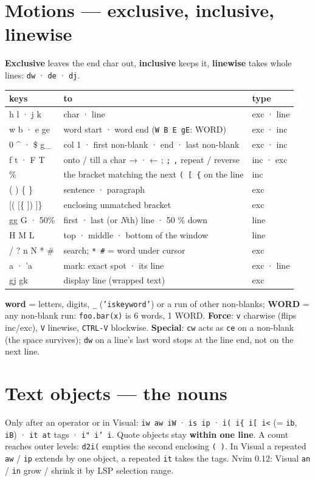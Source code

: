 \documentclass[8pt]{extarticle}
\newcommand\ct[1]{\texttt{#1}}
\newcommand\bq{\textasciigrave}
\newcommand\ca{\textasciicircum}
\begin{document}
\begin{multicols}{2}
\section{Motions — exclusive, inclusive, linewise}
\textbf{Exclusive} leaves the end char out, \textbf{inclusive} keeps it, \textbf{linewise}
takes whole lines: \ct{dw} · \ct{de} · \ct{dj}.\par
{\scriptsize\setlength{\tabcolsep}{2pt}
\begin{tabular}{@{}T{17mm}L{48mm}L{12mm}@{}}
\toprule
\textrm{\textbf{keys}} & \textbf{to} & \textbf{type}\\
\midrule
h l · j k & char · line & exc · line\\
w b · e ge & word start · word end (\texttt{W B E gE}: WORD) & exc · inc\\
0 \ca{} · \$ g\_ & col 1 · first non-blank · end · last non-blank & exc · inc\\
f t · F T & onto / till a char → · ← ; \texttt{;} \texttt{,} repeat / reverse & inc · exc\\
\% & the bracket matching the next \texttt{( [ \{} on the line & inc\\
( ) \{ \} & sentence · paragraph & exc\\
{}[( [\{ ]) ]\} & enclosing unmatched bracket & exc\\
gg G · 50\% & first · last (or \emph{N}th) line · 50 \% down & line\\
H M L & top · middle · bottom of the window & line\\
/ ? n N * \# & search; \texttt{* \#} = word under cursor & exc\\
\bq{}a · 'a & mark: exact spot · its line & exc · line\\
gj gk & display line (wrapped text) & exc\\
\bottomrule
\end{tabular}}\par
\textbf{word} = letters, digits, \ct{\_} (\texttt{'iskeyword'}) or a run of other non-blanks;
\textbf{WORD} = any non-blank run: \ct{foo.bar(x)} is 6 words, 1 WORD. \textbf{Force}: \ct{v}
charwise (flips inc/exc), \ct{V} linewise, \ct{CTRL-V} blockwise. \textbf{Special}: \ct{cw} acts
as \ct{ce} on a non-blank (the space survives); \ct{dw} on a line's last word stops at the line
end, not on the next line.

\section{Text objects — the nouns}
Only after an operator or in Visual: \ct{iw aw iW} · \ct{is ip} · \ct{i( i\{ i[ i<} (= \ct{ib},
\ct{iB}) · \ct{it at} tags · \ct{i" i' i\bq}. Quote objects stay \textbf{within one line}. A count
reaches outer levels: \ct{d2i(} empties the second enclosing \ct{( )}. In Visual a repeated
\ct{aw} / \ct{ip} extends by one object, a repeated \ct{it} takes the tags. Nvim 0.12: Visual
\ct{an} / \ct{in} grow / shrink it by LSP selection range.


\end{multicols}
\end{document}
